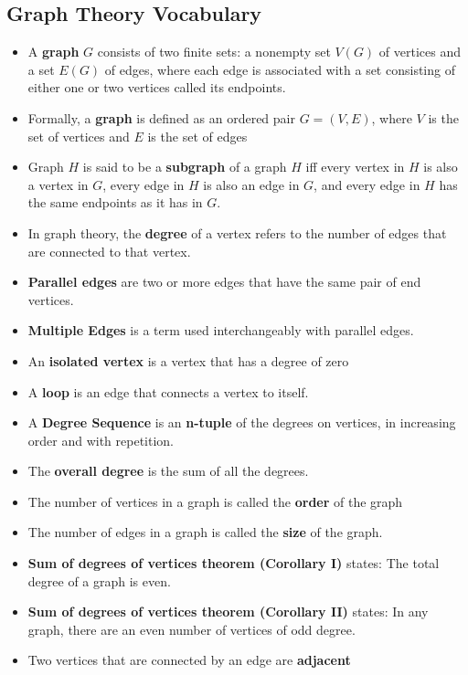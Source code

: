 \documentclass{report}
\begin{document}
      \subsection{Graph Theory Vocabulary}
      \bigbreak \noindent 
      \begin{itemize}
        \item A \textbf{graph} $G$ consists of two finite sets: a nonempty set $V(G)$ of vertices and a set $E(G)$ of edges, where each edge is associated with a set consisting of either one or two vertices called its endpoints.
        \item Formally, a \textbf{graph} is defined as an ordered pair $G = (V,E)$, where $V$ is the set of vertices and $E$ is the set of edges
        \item Graph $H$ is said to be a \textbf{subgraph} of a graph $H$ iff every vertex in $H$ is also a vertex in $G$, every edge in $H$ is also an edge in $G$, and every edge in $H$ has the same endpoints as it has in $G$.
        \item In graph theory, the \textbf{degree} of a vertex refers to the number of edges that are connected to that vertex.
        \item \textbf{Parallel edges} are two or more edges that have the same pair of end vertices.
        \item \textbf{Multiple Edges} is a term used interchangeably with parallel edges.
        \item An \textbf{isolated vertex} is a vertex that has a degree of zero
        \item A \textbf{loop} is an edge that connects a vertex to itself.
        \item A \textbf{Degree Sequence} is an \textbf{n-tuple} of the degrees on vertices, in increasing order and with repetition.
        \item The \textbf{overall degree} is the sum of all the degrees.
        \item The number of vertices in a graph is called the \textbf{order} of the graph
        \item The number of edges in a graph is called the \textbf{size} of the graph.
      \item \textbf{Sum of degrees of vertices theorem (Corollary I)} states: The total degree of a graph is even. 
      \item \textbf{Sum of degrees of vertices theorem (Corollary II)} states: In any graph, there are an even number of vertices of odd degree.
      \item Two vertices that are connected by an edge are  \textbf{adjacent}

\end{itemize}
\end{document}

